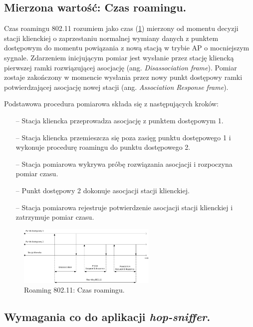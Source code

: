 \subsection{Mierzona wartość: Czas roamingu.}
Czas roamingu 802.11 rozumiem jako czas (\ref{RoamingTime}) mierzony od momentu decyzji stacji klienckiej o zaprzestaniu normalnej wymiany danych z punktem dostępowym do momentu powiązania z nową stacją w trybie AP o mocniejszym sygnale. Zdarzeniem inicjującym pomiar jest wysłanie przez stację kliencką pierwszej ramki rozwiązującej asocjację (ang. \emph{Disassociation frame}). Pomiar zostaje zakończony w momencie wysłania przez nowy punkt dostępowy ramki potwierdzającej asocjację nowej stacji (ang. \emph{Association Response frame}).

Podstawowa procedura pomiarowa składa się z następujących kroków:
\begin{itemize}
\item[--] Stacja kliencka przeprowadza asocjację z punktem dostępowym 1.
\item[--] Stacja kliencka przemieszcza się poza zasięg punktu dostępowego 1 i wykonuje procedurę roamingu do punktu dostępowego 2.
\item[--] Stacja pomiarowa wykrywa próbę rozwiązania asocjacji i rozpoczyna pomiar czasu.
\item[--] Punkt dostępowy 2 dokonuje asocjacji stacji klienckiej.
\item[--] Stacja pomiarowa rejestruje potwierdzenie asocjacji stacji klienckiej i zatrzymuje pomiar czasu.
\end{itemize}

\begin{figure}[htb]
\begin{center}
\includegraphics[width=250px]{img/RoamingTime}
\caption{Roaming 802.11: Czas roamingu.}
\label{RoamingTime}
\end{center}
\end{figure}

\subsection{Wymagania co do aplikacji \emph{hop-sniffer}.}
\label{sec:ApplicationRequirements}

